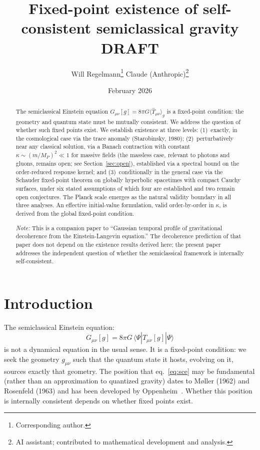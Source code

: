 \documentclass[12pt,a4paper]{article}
\title{\textbf{Fixed-point existence of self-consistent semiclassical gravity}\\[6pt]
{\large DRAFT}}
\author{Will Regelmann\thanks{Corresponding author.} \quad Claude (Anthropic)\thanks{AI
assistant; contributed to mathematical development and analysis.}}
\date{February 2026}
\begin{document}
\maketitle

\begin{abstract}
The semiclassical Einstein equation $G_{\mu\nu}[g] = 8\pi G\langle\hat{T}_{\mu\nu}\rangle_g$
is a fixed-point condition: the geometry and quantum state must be mutually consistent.
We address the question of whether such fixed points exist. We establish existence at three
levels: (1)~exactly, in the cosmological case via the trace anomaly
(Starobinsky, 1980); (2)~perturbatively near any classical solution, via a Banach
contraction with constant $\kappa \sim (m/M_P)^2 \ll 1$ for massive fields (the massless case, relevant to photons and gluons, remains open; see Section~\ref{sec:open}), established
via a spectral bound on the order-reduced response kernel; and (3)~conditionally in the general
case via the Schauder fixed-point theorem on globally hyperbolic spacetimes with compact
Cauchy surfaces, under six stated assumptions of which four are established and two remain
open conjectures. The Planck scale emerges as the natural validity boundary in all three
analyses. An effective initial-value formulation, valid order-by-order in $\kappa$, is
derived from the global fixed-point condition.

\bigskip\noindent\textit{Note:} This is a companion paper to ``Gaussian temporal profile
of gravitational decoherence from the Einstein-Langevin equation.'' The decoherence
prediction of that paper does not depend on the existence results derived here; the present
paper addresses the independent question of whether the semiclassical framework is
internally self-consistent.
\end{abstract}

\section{Introduction}

The semiclassical Einstein equation:
\begin{equation}
G_{\mu\nu}[g] = 8\pi G\,\langle\Psi|\hat{T}_{\mu\nu}[g]|\Psi\rangle
\label{eq:sce}
\end{equation}
is not a dynamical equation in the usual sense. It is a fixed-point condition: we seek the
geometry $g_{\mu\nu}$ such that the quantum state it hosts, evolving on it, sources exactly
that geometry. The position that eq.~\eqref{eq:sce} may be fundamental (rather than an
approximation to quantized gravity) dates to M\o ller (1962) and Rosenfeld (1963) and has
been developed by Oppenheim~\cite{oppenheim}. Whether this position is internally
consistent depends on whether fixed points exist.
\end{document}
